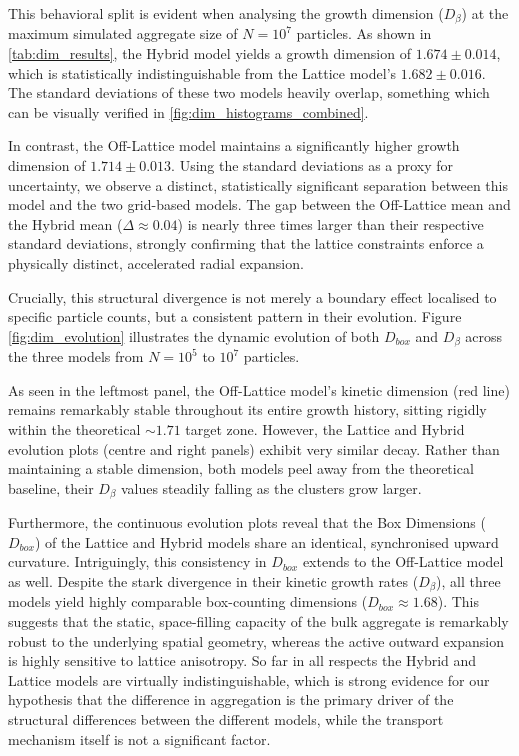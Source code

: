\documentclass[12pt, a4paper, oneside]{report}
\theoremstyle{remark}
\begin{document}
This behavioral split is evident when analysing the growth dimension ($D_{\beta}$) at the maximum simulated aggregate size of $N=10^7$ particles. As shown in \cref{tab:dim_results}, the Hybrid model yields a growth dimension of $1.674 \pm 0.014$, which is statistically indistinguishable from the Lattice model's $1.682 \pm 0.016$. The standard deviations of these two models heavily overlap, something which can be visually verified in \cref{fig:dim_histograms_combined}.

In contrast, the Off-Lattice model maintains a significantly higher growth dimension of $1.714 \pm 0.013$. Using the standard deviations as a proxy for uncertainty, we observe a distinct, statistically significant separation between this model and the two grid-based models. The gap between the Off-Lattice mean and the Hybrid mean ($\Delta \approx 0.04$) is nearly three times larger than their respective standard deviations, strongly confirming that the lattice constraints enforce a physically distinct, accelerated radial expansion. 

Crucially, this structural divergence is not merely a boundary effect localised to specific particle counts, but a consistent pattern in their evolution. Figure \cref{fig:dim_evolution} illustrates the dynamic evolution of both $D_{box}$ and $D_{\beta}$ across the three models from $N=10^5$ to $10^7$ particles. 

As seen in the leftmost panel, the Off-Lattice model's kinetic dimension (red line) remains remarkably stable throughout its entire growth history, sitting rigidly within the theoretical $\sim 1.71$ target zone. However, the Lattice and Hybrid evolution plots (centre and right panels) exhibit very similar decay. Rather than maintaining a stable dimension, both models peel away from the theoretical baseline, their $D_{\beta}$ values steadily falling as the clusters grow larger.

Furthermore, the continuous evolution plots reveal that the Box Dimensions ($D_{box}$) of the Lattice and Hybrid models share an identical, synchronised upward curvature. Intriguingly, this consistency in $D_{box}$ extends to the Off-Lattice model as well. Despite the stark divergence in their kinetic growth rates ($D_\beta$), all three models yield highly comparable box-counting dimensions ($D_{box} \approx 1.68$). This suggests that the static, space-filling capacity of the bulk aggregate is remarkably robust to the underlying spatial geometry, whereas the active outward expansion is highly sensitive to lattice anisotropy. So far in all respects the Hybrid and Lattice models are virtually indistinguishable, which is strong evidence for our hypothesis that the difference in aggregation is the primary driver of the structural differences between the different models, while the transport mechanism itself is not a significant factor.
\end{document}
